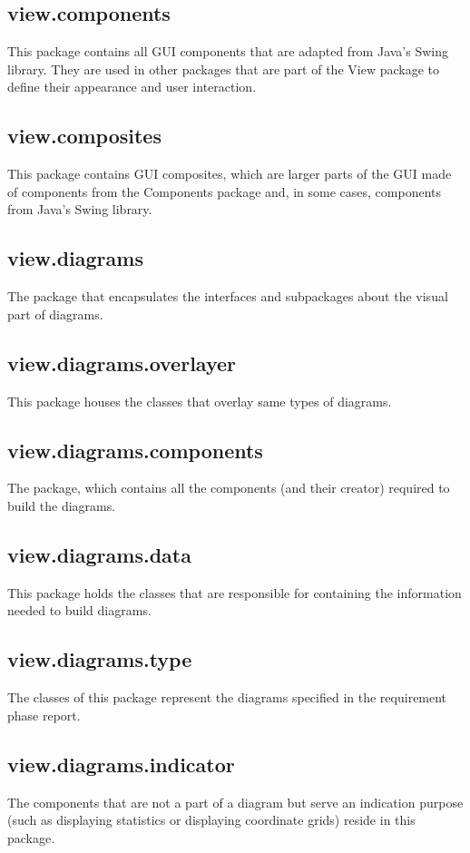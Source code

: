 \documentclass[10pt,a4paper]{report}
\begin{document}
    \subsection{view.components}
    This package contains all GUI components that are adapted from Java's Swing library. They are used in other packages that are part of the View package to define their appearance and user interaction.
    \subsection{view.composites}
    This package contains GUI composites, which are larger parts of the GUI made of components from the Components package and, in some cases, components from Java's Swing library.
    \subsection{view.diagrams}
    The package that encapsulates the interfaces and subpackages about the visual part of diagrams.
    \subsection{view.diagrams.overlayer}
    This package houses the classes that overlay same types of diagrams.
    \subsection{view.diagrams.components}
    The package, which contains all the components (and their creator) required to build the diagrams.
    \subsection{view.diagrams.data}
    This package holds the classes that are responsible for containing the information needed to build diagrams.
    \subsection{view.diagrams.type}
    The classes of this package represent the diagrams specified in the requirement phase report.
    \subsection{view.diagrams.indicator}
    The components that are not a part of a diagram but serve an indication purpose (such as displaying statistics or displaying coordinate grids) reside in this package.
\end{document}
